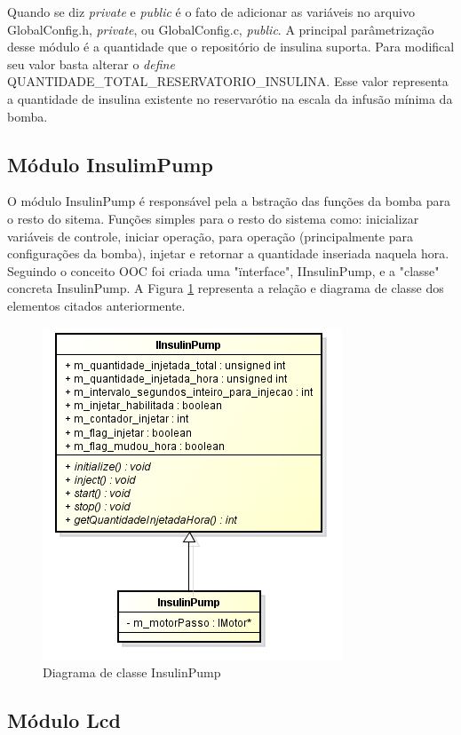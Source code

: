 Quando se diz \emph{private} e \emph{public} é o fato de adicionar as variáveis no arquivo GlobalConfig.h, \emph{private}, ou GlobalConfig.c, \emph{public}. A principal parâmetrização desse módulo é a quantidade que o repositório de insulina suporta. Para modifical seu valor basta alterar o \emph{define} QUANTIDADE\_TOTAL\_RESERVATORIO\_INSULINA. Esse valor representa a quantidade de insulina existente no reservarótio na escala da infusão mínima da bomba.

\subsection{Módulo InsulimPump}

O módulo InsulinPump é responsável pela a bstração das funções da bomba para o resto do sitema. Funções simples para o resto do sistema como: inicializar variáveis de controle, iniciar operação, para operação (principalmente para configurações da bomba), injetar e retornar a quantidade inseriada naquela hora. Seguindo o conceito OOC foi criada uma "ïnterface", IInsulinPump, e a "classe" concreta InsulinPump. A Figura \ref{fig:diagramainsulinpump} representa a relação e diagrama de classe dos elementos citados anteriormente.

\begin{figure}[htp]
	\centering
	\includegraphics[scale=1]{images/classe_insulinpump.png}
	\caption{Diagrama de classe InsulinPump}	
	\label{fig:diagramainsulinpump}
\end{figure}

\subsection{Módulo Lcd}

